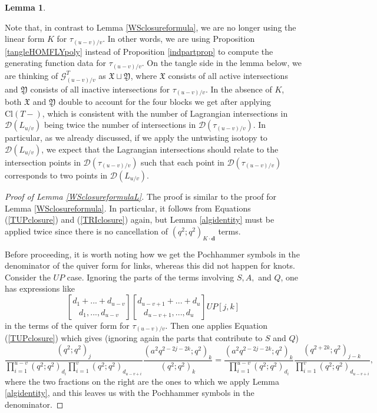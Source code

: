 \documentclass[11pt]{amsart}
\theoremstyle{plain}
\newtheorem{lemmaN}[theoremN]{Lemma}
\theoremstyle{definition}
\theoremstyle{remark}
\begin{document}
\begin{lemmaN}
\end{lemmaN}

Note that, in contrast to Lemma \ref{WSclosureformula}, we are no longer using the linear form $K$ for $\tau_{(u-v)/v}$. In other words, we are using Proposition \ref{tangleHOMFLYpoly} instead of Proposition \ref{indpartprop} to compute the generating function data for $\tau_{(u-v)/v}$. On the tangle side in the lemma below, we are thinking of $\mathcal{G}_{(u-v)/v}^T$ as $\mathfrak{X}\sqcup \mathfrak{Y}$, where $\mathfrak{X}$ consists of all active intersections and $\mathfrak{Y}$ consists of all inactive intersections for $\tau_{(u-v)/v}$. In the absence of $K$, both $\mathfrak{X}$ and $\mathfrak{Y}$ double to account for the four blocks we get after applying $\text{Cl}(T-)$, which is consistent with the number of Lagrangian intersections in $\mathcal{D}(L_{u/v})$ being twice the number of intersections in $\mathcal{D}(\tau_{(u-v)/v})$. In particular, as we already discussed, if we apply the untwisting isotopy to $\mathcal{D}(L_{u/v})$, we expect that the Lagrangian intersections should relate to the intersection points in $\mathcal{D}(\tau_{(u-v)/v})$ such that each point in $\mathcal{D}(\tau_{(u-v)/v})$ corresponds to two points in $\mathcal{D}(L_{u/v})$.

\begin{proof}[Proof of Lemma \ref{WSclosureformulaL}]
    The proof is similar to the proof for Lemma \ref{WSclosureformula}. In particular, it follows from Equations (\ref{TUPclosure}) and (\ref{TRIclosure}) again, but Lemma \ref{algidentity} must be applied twice since there is no cancellation of $(q^2;q^2)_{K\cdot \textbf{d}}$ terms.

    Before proceeding, it is worth noting how we get the Pochhammer symbols in the denominator of the quiver form for links, whereas this did not happen for knots. Consider the $UP$ case. Ignoring the parts of the terms involving $S,A,$ and $Q$, one has expressions like
    \[
    {d_1+...+d_{u-v}\brack d_1,...,d_{u-v}}{d_{u-v+1}+...+d_u\brack d_{u-v+1},...,d_u}UP[j,k]
    \]
    in the terms of the quiver form for $\tau_{(u-v)/v}$. Then one applies Equation (\ref{TUPclosure}) which gives (ignoring again the parts that contribute to $S$ and $Q$)
    \[
    \frac{(q^2;q^2)_j}{\prod_{i=1}^{u-v}(q^2;q^2)_{d_i} \prod_{i=1}^v(q^2;q^2)_{d_{u-v+i}}} \frac{(a^2q^{2-2j-2k};q^2)_k}{(q^2;q^2)_k}= \frac{(a^2q^{2-2j-2k};q^2)_k}{\prod_{i=1}^{u-v}(q^2;q^2)_{d_i}} \frac{(q^{2+2k};q^2)_{j-k}}{\prod_{i=1}^v(q^2;q^2)_{d_{u-v+i}}},
    \]
    where the two fractions on the right are the ones to which we apply Lemma \ref{algidentity}, and this leaves us with the Pochhammer symbols in the denominator.
\end{proof}
\end{document}

